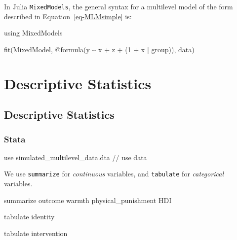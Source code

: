 \documentclass[
  letterpaper,
  DIV=11,
  numbers=noendperiod]{scrreprt}
\newenvironment{Shaded}{\begin{snugshade}}{\end{snugshade}}
\newcommand{\BuiltInTok}[1]{\textcolor[rgb]{0.00,0.23,0.31}{#1}}
\newcommand{\CommentTok}[1]{\textcolor[rgb]{0.37,0.37,0.37}{#1}}
\newcommand{\FloatTok}[1]{\textcolor[rgb]{0.68,0.00,0.00}{#1}}
\newcommand{\FunctionTok}[1]{\textcolor[rgb]{0.28,0.35,0.67}{#1}}
\newcommand{\ImportTok}[1]{\textcolor[rgb]{0.00,0.46,0.62}{#1}}
\newcommand{\KeywordTok}[1]{\textcolor[rgb]{0.00,0.23,0.31}{#1}}
\newcommand{\NormalTok}[1]{\textcolor[rgb]{0.00,0.23,0.31}{#1}}
\newcommand{\OperatorTok}[1]{\textcolor[rgb]{0.37,0.37,0.37}{#1}}
\newcommand{\PreprocessorTok}[1]{\textcolor[rgb]{0.68,0.00,0.00}{#1}}
\begin{document}
In Julia \texttt{MixedModels}, the general syntax for a multilevel model
of the form described in Equation~\ref{eq-MLMsimple} is:

\begin{Shaded}
\begin{Highlighting}[]
\ImportTok{using} \BuiltInTok{MixedModels}

\FunctionTok{fit}\NormalTok{(MixedModel, }\PreprocessorTok{@formula}\NormalTok{(y }\OperatorTok{\textasciitilde{}}\NormalTok{ x }\OperatorTok{+}\NormalTok{ z }\OperatorTok{+}\NormalTok{ (}\FloatTok{1} \OperatorTok{+}\NormalTok{ x }\OperatorTok{|}\NormalTok{ group)), data)}
\end{Highlighting}
\end{Shaded}


\chapter{Descriptive Statistics}\label{descriptive-statistics}

\section{Descriptive Statistics}\label{descriptive-statistics-1}

\subsection{Stata}

\begin{Shaded}
\begin{Highlighting}[]

\KeywordTok{use}\NormalTok{ simulated\_multilevel\_data.dta }\CommentTok{// use data}
\end{Highlighting}
\end{Shaded}

We use \texttt{summarize} for \emph{continuous} variables, and
\texttt{tabulate} for \emph{categorical} variables.

\begin{Shaded}
\begin{Highlighting}[]
\KeywordTok{summarize}\NormalTok{ outcome warmth physical\_punishment HDI}

\KeywordTok{tabulate} \KeywordTok{identity}

\KeywordTok{tabulate}\NormalTok{ intervention}
\end{Highlighting}
\end{Shaded}
\end{document}
